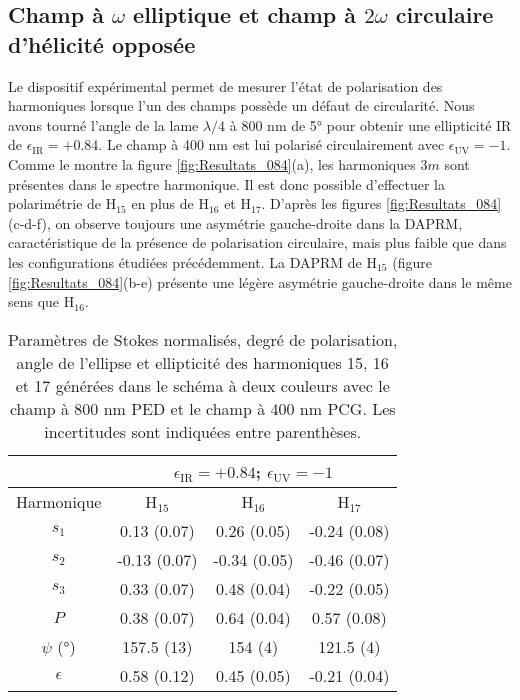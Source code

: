 \subsection{Champ à $\omega$ elliptique et champ à $2\omega$ circulaire d'hélicité opposée}
Le dispositif expérimental permet de mesurer l'état de polarisation des harmoniques lorsque l'un des champs possède un défaut de circularité. Nous avons tourné l'angle de la lame $\lambda/4$ à 800 nm de 5° pour obtenir une ellipticité IR de $\epsilon_{\text{IR}} = +0.84$. Le champ à 400 nm est lui polarisé circulairement avec $\epsilon_{\text{UV}} = -1$. Comme le montre la figure \ref{fig:Resultats_084}(a), les harmoniques $3m$ sont présentes dans le spectre harmonique. Il est donc possible d'effectuer la polarimétrie de H$_{15}$ en plus de H$_{16}$ et H$_{17}$. D'après les figures \ref{fig:Resultats_084}(c-d-f), on observe toujours une asymétrie gauche-droite dans la DAPRM, caractéristique de la présence de polarisation circulaire, mais plus faible que dans les configurations étudiées précédemment. La DAPRM de H$_{15}$ (figure \ref{fig:Resultats_084}(b-e) présente une légère asymétrie gauche-droite dans le même sens que H$_{16}$.

\begin{table}[h]
\centering
\begin{tabular}{|c||c|c|c|}
\hline
 & \multicolumn{3}{c|}{$\epsilon_{\text{IR}} = +0.84$; $\epsilon_{\text{UV}} = -1$} \\
\hline
Harmonique & H$_{15}$ & H$_{16}$ & H$_{17}$ \\
\hline
$s_1$ & 0.13 (0.07) & 0.26 (0.05) & -0.24 (0.08) \\
\hline
$s_2$ & -0.13 (0.07) & -0.34 (0.05) & -0.46 (0.07)  \\
\hline
$s_3$ & 0.33 (0.07) & 0.48 (0.04) & -0.22 (0.05) \\
\hline
$P$ & 0.38 (0.07) & 0.64 (0.04) & 0.57 (0.08) \\
\hline
$\psi$ (°) & 157.5 (13) & 154 (4) & 121.5 (4) \\
\hline
$\epsilon$ & 0.58 (0.12) & 0.45 (0.05) & -0.21 (0.04) \\
\hline
\end{tabular}
\caption{Paramètres de Stokes normalisés, degré de polarisation, angle de l'ellipse et ellipticité des harmoniques 15, 16 et 17 générées dans le schéma à deux couleurs avec le champ à 800 nm PED et le champ à 400 nm PCG. Les incertitudes sont indiquées entre parenthèses.}
\label{tab:resultats084}
\end{table}

